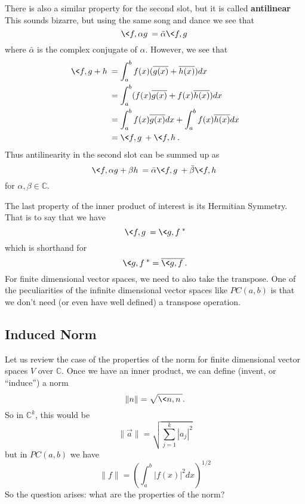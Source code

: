 There is also a similar property for the second slot, but it
is called \textbf{antilinear}
This sounds bizarre, but using the same song and dance we
see that
\begin{equation}
\<f,\alpha g\> = \bar{\alpha}\<f,g\>
\end{equation}
where $\bar{\alpha}$ is the complex conjugate of
$\alpha$. However, we see that
\begin{subequations}
\begin{align}
\<f,g+h\> &=
\int^{b}_{a}f(x)(\overline{g(x)}+\overline{h(x)})dx \\
&= \int^{b}_{a}(f(x)\overline{g(x)}+f(x)\overline{h(x)})dx \\
&= \int^{b}_{a}f(x)\overline{g(x)}dx+\int^{b}_{a}f(x)\overline{h(x)}dx\\
&= \<f,g\> + \<f,h\>.
\end{align}
\end{subequations}
Thus antilinearity in the second slot can be summed up as
\begin{equation}
\<f,\alpha g + \beta h\> = \bar{\alpha}\<f,g\> +
\bar{\beta}\<f,h\>
\end{equation}
for $\alpha,\beta\in\mathbb{C}$.

The last property of the inner product of interest is its
Hermitian Symmetry. 
That is to say that we have
\begin{equation}
\<f,g\> = \<g,f\>^{*}
\end{equation}
which is shorthand for
\begin{equation}
\<g,f\>^{*} = \overline{\<g,f\>}.
\end{equation}
For finite dimensional vector spaces, we need to also take
the transpose. One of the peculiarities of the infinite
dimensional vector spaces like $PC(a,b)$ is that we don't
need (or even have well defined) a transpose operation.

\subsection{Induced Norm}

Let us review the case of the properties of the norm for
finite dimensional vector spaces $V$ over $\mathbb{C}$. Once
we have an inner product, we can define (invent, or
``induce'') a norm
\begin{equation}
\|n\| = \sqrt{\<n,n\>}.
\end{equation}
So in $\mathbb{C}^k$, this would be
\begin{equation}
\|\vec{a}\| = \sqrt{\sum^{k}_{j=1}|a_{j}|^{2}}
\end{equation}
but in $PC(a,b)$ we have
\begin{equation}
\|f\| = \left(\int^{b}_{a}|f(x)|^{2}dx\right)^{1/2}
\end{equation}
So the question arises: what are the properties of the norm?

